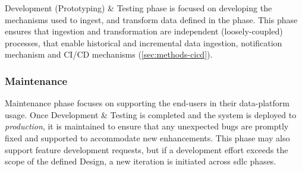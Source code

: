 Development (Prototyping) \& Testing phase is focused on developing the mechanisms used to ingest, and transform data defined in the  phase. This phase ensures that ingestion and transformation are independent (\gls{loosely-coupled}) processes, that enable historical and incremental data ingestion, notification mechanism and CI/CD mechanisms (\ref{sec:methods-cicd}).


\vspace{1.2cm}
\subsubsection{Maintenance}
\label{subsec:sdlc-maintenance}

Maintenance phase focuses on supporting the end-users in their \gls{data-platform} usage. Once Development \& Testing is completed and the system is deployed to \textit{production}, it is maintained to ensure that any unexpected \glspl{bug} are promptly fixed and supported to accommodate new \glspl{enhancement}. This phase may also support \gls{feature} development requests, but if a development effort exceeds the scope of the defined Design, a new iteration is initiated across \acrshort{sdlc} phases.
